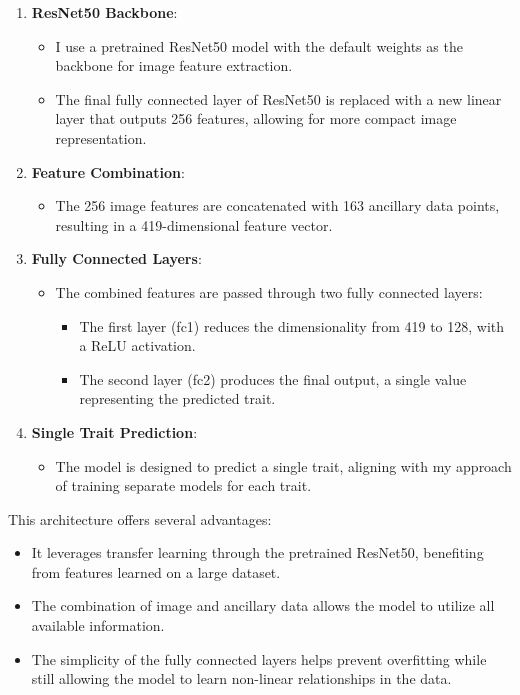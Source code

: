 \documentclass{article}
\begin{document}
\begin{enumerate}
    \item \textbf{ResNet50 Backbone}: 
    \begin{itemize}
        \item I use a pretrained ResNet50 model with the default weights as the backbone for image feature extraction.
        \item The final fully connected layer of ResNet50 is replaced with a new linear layer that outputs 256 features, allowing for more compact image representation.
    \end{itemize}
    
    \item \textbf{Feature Combination}:
    \begin{itemize}
        \item The 256 image features are concatenated with 163 ancillary data points, resulting in a 419-dimensional feature vector.
    \end{itemize}
    
    \item \textbf{Fully Connected Layers}:
    \begin{itemize}
        \item The combined features are passed through two fully connected layers:
        \begin{itemize}
            \item The first layer (fc1) reduces the dimensionality from 419 to 128, with a ReLU activation.
            \item The second layer (fc2) produces the final output, a single value representing the predicted trait.
        \end{itemize}
    \end{itemize}
    
    \item \textbf{Single Trait Prediction}:
    \begin{itemize}
        \item The model is designed to predict a single trait, aligning with my approach of training separate models for each trait.
    \end{itemize}
\end{enumerate}

This architecture offers several advantages:
\begin{itemize}
    \item It leverages transfer learning through the pretrained ResNet50, benefiting from features learned on a large dataset.
    \item The combination of image and ancillary data allows the model to utilize all available information.
    \item The simplicity of the fully connected layers helps prevent overfitting while still allowing the model to learn non-linear relationships in the data.
\end{itemize}
\end{document}
